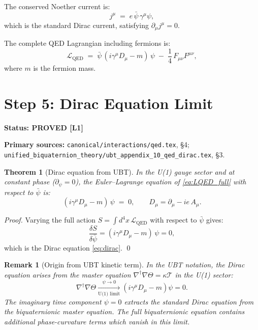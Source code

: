 \documentclass[11pt,a4paper]{article}
\newtheorem{theorem}{Theorem}
\newtheorem{remark}{Remark}
\newcommand{\Lone}{\textbf{[L1]}}
\newcommand{\PROVED}{\textbf{PROVED}}
\begin{document}
The conserved Noether current is:
\begin{equation}\label{eq:jmu}
  j^\mu \;=\; e\,\bar\psi\,\gamma^\mu\psi,
\end{equation}
which is the standard Dirac current, satisfying $\partial_\mu j^\mu = 0$.

The complete QED Lagrangian including fermions is:
\begin{equation}\label{eq:LQED_full}
  \mathcal{L}_{\mathrm{QED}}
  \;=\;
  \bar\psi\,(i\gamma^\mu D_\mu - m)\,\psi
  \;-\;
  \frac{1}{4}\,F_{\mu\nu}F^{\mu\nu},
\end{equation}
where $m$ is the fermion mass.

\section{Step 5: Dirac Equation Limit}

\noindent\textbf{Status: \PROVED{} \Lone}

\noindent\textbf{Primary sources:}
\texttt{canonical/interactions/qed.tex}, \S4;
\texttt{unified\_biquaternion\_theory/ubt\_appendix\_10\_qed\_dirac.tex}, \S3.

\medskip

\begin{theorem}[Dirac equation from UBT]
\label{thm:dirac}
In the U(1) gauge sector and at constant phase ($\partial_\psi = 0$),
the Euler--Lagrange equation of \eqref{eq:LQED_full} with respect to
$\bar\psi$ is:
\begin{equation}\label{eq:dirac}
  (i\gamma^\mu D_\mu - m)\,\psi \;=\; 0,
  \qquad
  D_\mu = \partial_\mu - ie\,A_\mu.
\end{equation}
\end{theorem}

\begin{proof}
Varying the full action $S = \int d^4x\,\mathcal{L}_{\mathrm{QED}}$ with
respect to $\bar\psi$ gives:
\begin{equation}
  \frac{\delta S}{\delta\bar\psi}
  = (i\gamma^\mu D_\mu - m)\,\psi = 0,
\end{equation}
which is the Dirac equation \eqref{eq:dirac}. \qed
\end{proof}

\begin{remark}[Origin from UBT kinetic term]
In the UBT notation, the Dirac equation arises from the master equation
$\nabla^\dagger\nabla\Theta = \kappa\mathcal{T}$ in the U(1) sector:
\begin{equation}
  \nabla^\dagger\nabla\Theta \xrightarrow[\text{U(1) limit}]{\psi\to 0}
  (i\gamma^\mu D_\mu - m)\psi = 0.
\end{equation}
The imaginary time component $\psi = 0$ extracts the standard Dirac equation
from the biquaternionic master equation. The full biquaternionic equation
contains additional phase-curvature terms which vanish in this limit.
\end{remark}
\end{document}
